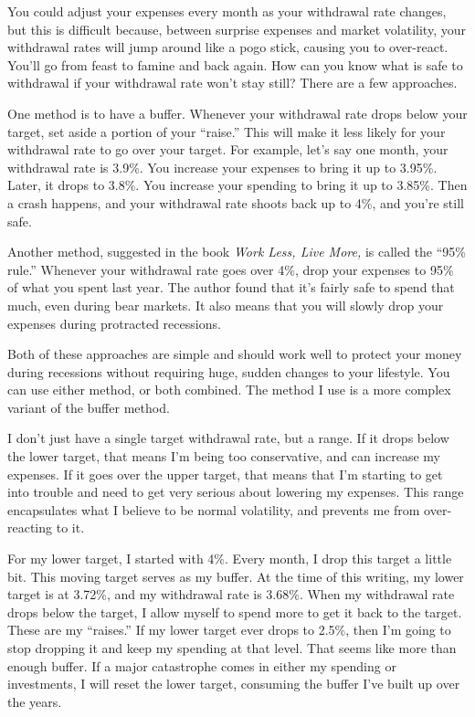 You could adjust your expenses every month as your withdrawal rate changes, but this is difficult because, between surprise expenses and market volatility, your withdrawal rates will jump around like a pogo stick, causing you to over-react. You'll go from feast to famine and back again. How can you know what is safe to withdrawal if your withdrawal rate won't stay still? There are a few approaches.

One method is to have a buffer. Whenever your withdrawal rate drops below your target, set aside a portion of your ``raise.'' This will make it less likely for your withdrawal rate to go over your target. For example, let's say one month, your withdrawal rate is 3.9\%. You increase your expenses to bring it up to 3.95\%. Later, it drops to 3.8\%. You increase your spending to bring it up to 3.85\%. Then a crash happens, and your withdrawal rate shoots back up to 4\%, and you're still safe.

Another method, suggested in the book \emph{Work Less, Live More,} is called the ``95\% rule.'' Whenever your withdrawal rate goes over 4\%, drop your expenses to 95\% of what you spent last year. The author found that it's fairly safe to spend that much, even during bear markets. It also means that you will slowly drop your expenses during protracted recessions.

Both of these approaches are simple and should work well to protect your money during recessions without requiring huge, sudden changes to your lifestyle. You can use either method, or both combined. The method I use is a more complex variant of the buffer method.

I don't just have a single target withdrawal rate, but a range. If it drops below the lower target, that means I'm being too conservative, and can increase my expenses. If it goes over the upper target, that means that I'm starting to get into trouble and need to get very serious about lowering my expenses. This range encapsulates what I believe to be normal volatility, and prevents me from over-reacting to it.

For my lower target, I started with 4\%. Every month, I drop this target a little bit. This moving target serves as my buffer. At the time of this writing, my lower target is at 3.72\%, and my withdrawal rate is 3.68\%. When my withdrawal rate drops below the target, I allow myself to spend more to get it back to the target. These are my ``raises.'' If my lower target ever drops to 2.5\%, then I'm going to stop dropping it and keep my spending at that level. That seems like more than enough buffer. If a major catastrophe comes in either my spending or investments, I will reset the lower target, consuming the buffer I've built up over the years.

